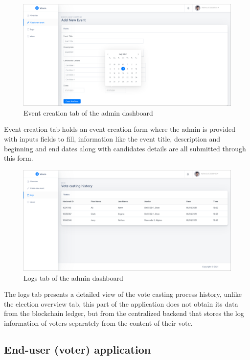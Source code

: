 \begin{figure}[H]
	\centering
		\includegraphics[width=14cm]{images/chapter3/admin_2.png}
		\caption{{\footnotesize Event creation tab of the admin dashboard}}
\end{figure}

Event creation tab holds an event creation form where the admin is provided with inputs fields to fill, information like the event title, description and beginning and end dates along with candidates details are all submitted through this form.

\begin{figure}[H]
	\centering
		\includegraphics[width=14cm]{images/chapter3/admin_3.png}
		\caption{{\footnotesize Logs tab of the admin dashboard}}
\end{figure}

The logs tab presents a detailed view of the vote casting process history, unlike the election overview tab, this part of the application does not obtain its data from the blockchain ledger, but from the centralized backend that stores the log information of voters separately from the content of their vote.

\subsection{End-user (voter) application}

